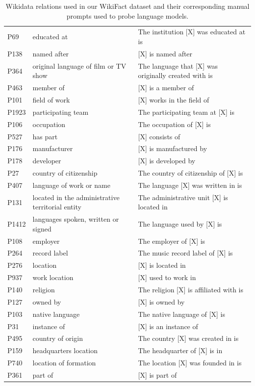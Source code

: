 \begin{table}[!ht]
{\begin{tabular}{l|l|l}
        P69 & educated at & The institution [X] was educated at is \\ 
        P138 & named after & [X] is named after \\ 
        P364 & original language of film or TV show & The language that [X] was originally created with is \\ 
        P463 & member of & [X] is a member of \\ 
        P101 & field of work & [X] works in the field of \\ 
        P1923 & participating team & The participating team at [X] is \\ 
        P106 & occupation & The occupation of [X] is \\ 
        P527 & has part & [X] consists of \\ 
        P176 & manufacturer & [X] is manufactured by \\ 
        P178 & developer & [X] is developed by \\ 
        P27 & country of citizenship & The country of citizenship of [X] is \\ 
        P407 & language of work or name & The language [X] was written in is \\ 
        P131 & located in the administrative territorial entity & The administrative unit [X] is located in \\ 
        P1412 & languages spoken, written or signed & The language used by [X] is \\ 
        P108 & employer & The employer of [X] is \\ 
        P264 & record label & The music record label of [X] is \\ 
        P276 & location & [X] is located in \\ 
        P937 & work location & [X] used to work in \\ 
        P140 & religion & The religion [X] is affiliated with is \\ 
        P127 & owned by & [X] is owned by \\ 
        P103 & native language & The native language of [X] is \\ 
        P31 & instance of & [X] is an instance of \\ 
        P495 & country of origin & The country [X] was created in is \\ 
        P159 & headquarters location & The headquarter of [X] is in \\ 
        P740 & location of formation & The location [X] was founded in is \\ 
        P361 & part of & [X] is part of \\ \bottomrule
    \end{tabular}}
    \caption{Wikidata relations used in our WikiFact dataset and their corresponding manual prompts used to probe language models.}
    \label{tab:wikifact-relation}
\end{table}